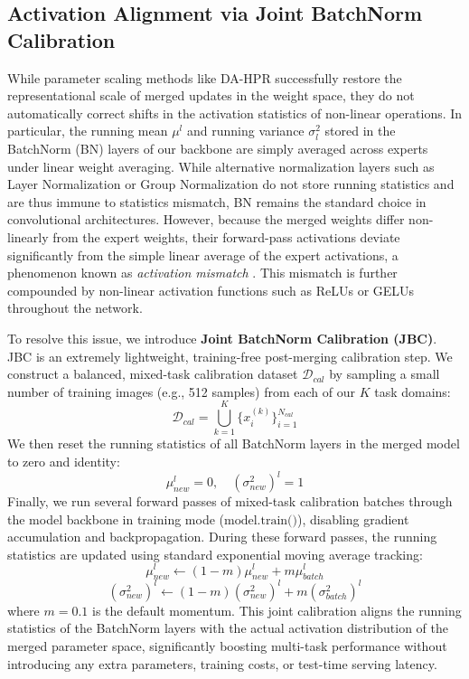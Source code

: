 \documentclass{article}
\theoremstyle{plain}
\theoremstyle{definition}
\theoremstyle{remark}
\begin{document}
\subsection{Activation Alignment via Joint BatchNorm Calibration}
While parameter scaling methods like DA-HPR successfully restore the representational scale of merged updates in the weight space, they do not automatically correct shifts in the activation statistics of non-linear operations. In particular, the running mean $\mu^l$ and running variance $\sigma^2_l$ stored in the BatchNorm (BN) layers \cite{ioffe2015batch} of our backbone are simply averaged across experts under linear weight averaging. While alternative normalization layers such as Layer Normalization \cite{ba2016layer} or Group Normalization \cite{wu2018group} do not store running statistics and are thus immune to statistics mismatch, BN remains the standard choice in convolutional architectures. However, because the merged weights differ non-linearly from the expert weights, their forward-pass activations deviate significantly from the simple linear average of the expert activations, a phenomenon known as \emph{activation mismatch} \cite{jordan2022repair}. This mismatch is further compounded by non-linear activation functions such as ReLUs or GELUs \cite{hendrycks2016gaussian} throughout the network. 

To resolve this issue, we introduce \textbf{Joint BatchNorm Calibration (JBC)}. JBC is an extremely lightweight, training-free post-merging calibration step. We construct a balanced, mixed-task calibration dataset $\mathcal{D}_{cal}$ by sampling a small number of training images (e.g., 512 samples) from each of our $K$ task domains:
\begin{equation}
    \mathcal{D}_{cal} = \bigcup_{k=1}^K \{x_i^{(k)}\}_{i=1}^{N_{cal}}
\end{equation}
We then reset the running statistics of all BatchNorm layers in the merged model to zero and identity:
\begin{equation}
    \mu_{new}^l = 0, \quad (\sigma^2_{new})^l = 1
\end{equation}
Finally, we run several forward passes of mixed-task calibration batches through the model backbone in training mode ($\text{model.train()}$), disabling gradient accumulation and backpropagation. During these forward passes, the running statistics are updated using standard exponential moving average tracking:
\begin{equation}
    \mu_{new}^l \leftarrow (1-m)\mu_{new}^l + m \mu_{batch}^l
\end{equation}
\begin{equation}
    (\sigma^2_{new})^l \leftarrow (1-m)(\sigma^2_{new})^l + m (\sigma^2_{batch})^l
\end{equation}
where $m = 0.1$ is the default momentum. This joint calibration aligns the running statistics of the BatchNorm layers with the actual activation distribution of the merged parameter space, significantly boosting multi-task performance without introducing any extra parameters, training costs, or test-time serving latency.
\end{document}
